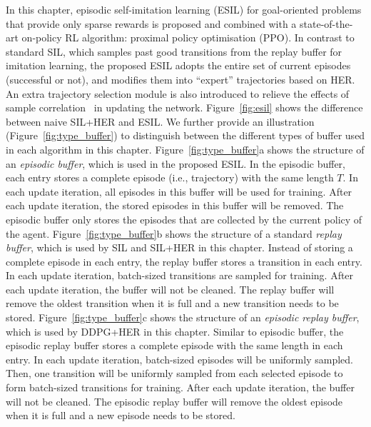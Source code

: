 In this chapter, {episodic self-imitation learning (ESIL) for goal-oriented problems that provide only sparse rewards is proposed and combined with a state-of-the-art on-policy RL algorithm:} proximal policy optimisation (PPO). In contrast to standard SIL, which samples past good transitions from the replay buffer for imitation learning, {the proposed} ESIL adopts the entire set of current episodes {(successful or not)}, and modifies them into ``expert'' trajectories based on HER. An extra trajectory selection module is also introduced to relieve the effects of sample correlation~\cite{lee2019sample} in updating the network. Figure~\ref{fig:esil} shows the difference between naive SIL+HER and ESIL. We further provide an illustration (Figure~\ref{fig:type_buffer}) to distinguish between the different types of buffer used in each algorithm in this chapter. Figure~\ref{fig:type_buffer}a shows the structure of an \textit{episodic buffer}, which is used in the proposed ESIL. In the episodic buffer, each entry stores a complete episode (i.e., trajectory) with the same length $T$. In each update iteration, all episodes in this buffer will be used for training. After each update iteration, the stored episodes in this buffer will be removed. The episodic buffer only stores the episodes that are collected by the current policy of the agent. Figure~\ref{fig:type_buffer}b shows the structure of a standard \textit{replay buffer}, which is used by SIL and SIL+HER in this chapter. Instead of storing a complete episode in each entry, the replay buffer stores a transition in each entry. In each update iteration, batch-sized transitions are sampled for training. After each update iteration, the buffer will not be cleaned. The replay buffer will remove the oldest transition when it is full and a new transition needs to be stored. Figure~\ref{fig:type_buffer}c shows the structure of an \textit{episodic replay buffer}, which is used by DDPG+HER in this chapter. Similar to episodic buffer, the episodic replay buffer stores a complete episode with the same length in each entry. In each update iteration, batch-sized episodes will be uniformly sampled. Then, one transition will be uniformly sampled from each selected episode to form batch-sized transitions for training. After each update iteration, the buffer will not be cleaned. The episodic replay buffer will remove the oldest episode when it is full and a new episode needs to be stored.

